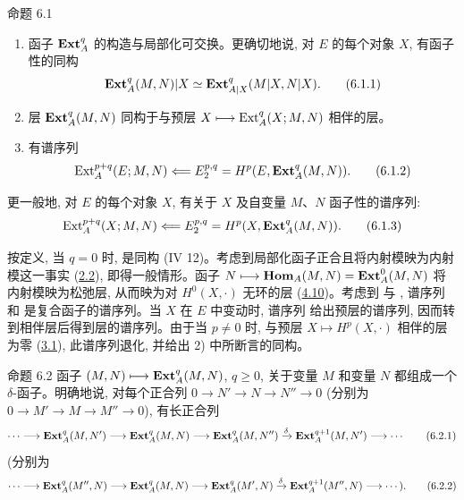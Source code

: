 \begin{enonce*}{命题 6.1}
\begin{enumerate}
\renewcommand{\labelenumi}{\theenumi)}
\item 函子 $\operatorname{\mathbf{Ext}}^q_A$ 的构造与局部化可交换。更确切地说, 对 $E$ 的每个对象 $X$, 有函子性的同构
\begin{equation*}
\operatorname{\mathbf{Ext}}^q_A(M,N)|X\simeq
\operatorname{\mathbf{Ext}}^q_{A|X}(M|X,N|X){}.\tag{6.1.1}
\end{equation*}

\item 层 $\operatorname{\mathbf{Ext}}^q_A(M,N)$ 同构于与预层 $X\longmapsto\operatorname{Ext}^q_A(X;M,N)$ 相伴的层。

\item 有谱序列
\begin{equation*}
\operatorname{Ext}^{p+q}_A(E;M,N)\Longleftarrow E^{p,q}_2
=H^p(E,\operatorname{\mathbf{Ext}}^q_A(M,N)){}.\tag{6.1.2}
\end{equation*}
\end{enumerate}
更\pageoriginale 一般地, 对 $E$ 的每个对象 $X$, 有关于 $X$ 及自变量 $M$、$N$ 函子性的谱序列:
\begin{equation*}
\operatorname{Ext}^{p+q}_A(X;M,N)\Longleftarrow E^{p,q}_2
=H^p(X,\operatorname{\mathbf{Ext}}^q_A(M,N)){}.\tag{6.1.3}
\end{equation*}
\end{enonce*}

按定义, 当 $q=0$ 时,  是同构 (IV 12)。考虑到局部化函子正合且将内射模映为内射模这一事实 (\hyperref[V.subsec2.2]{2.2}), 即得一般情形。函子 $N\longmapsto\operatorname{\mathbf{Hom}}_A(M,N)=\operatorname{\mathbf{Ext}}^0_A(M,N)$ 将内射模映为松弛层, 从而映为对 $H^{0}(X,⋅)$ 无环的层 (\hyperref[V.prop4.10]{4.10})。考虑到  与 , 谱序列  和  是复合函子的谱序列。当 $X$ 在 $E$ 中变动时, 谱序列  给出预层的谱序列, 因而转到相伴层后得到层的谱序列。由于当 $p\neq0$ 时, 与预层 $X\longmapsto H^p(X,⋅)$ 相伴的层为零 (\hyperref[V.prop3.1]{3.1}), 此谱序列退化, 并给出 2) 中所断言的同构。

\begin{enonce*}{命题 6.2}
函子 $(M,N)\longmapsto\operatorname{\mathbf{Ext}}^q_A(M,N)$, $q\geq0$, 关于变量 $M$ 和变量 $N$ 都组成一个 $\delta$-函子。明确地说, 对每个正合列
$0\to N'\to N\to N''\to0$
(分别为 $0\to M'\to M\to M''\to0$), 有长正合列
\begin{equation*}
\cdots\to\Eext^q_A(M,N')\to\Eext^q_A(M,N)\to\Eext^q_A(M,N'')
\xrightarrow{\delta}\Eext^{q+1}_A(M,N')\to\cdots\tag{6.2.1}
\end{equation*}
(分别为
\begin{equation*}
\cdots\to\Eext^q_A(M'',N)\to\Eext^q_A(M,N)\to\Eext^q_A(M',N)
\xrightarrow{\delta}\Eext^{q+1}_A(M'',N)\to\cdots){\quoi}.
\tag{6.2.2}
\end{equation*}
\end{enonce*}


